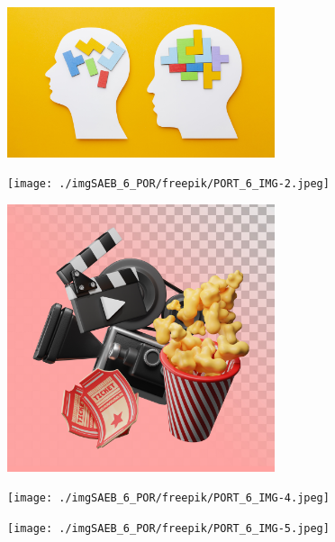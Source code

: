 \begin{figure}
\includegraphics[width=0.7\textwidth]{./imgSAEB_6_POR/freepik/PORT_6_IMG-1.jpeg}
\end{figure}

\begin{figure}
\texttt{[image: ./imgSAEB\_6\_POR/freepik/PORT\_6\_IMG-2.jpeg]}
\end{figure}

\begin{figure}
\includegraphics[width=0.7\textwidth]{./imgSAEB_6_POR/freepik/PORT_6_IMG-3.jpeg}
\end{figure}

\begin{figure}
\texttt{[image: ./imgSAEB\_6\_POR/freepik/PORT\_6\_IMG-4.jpeg]}
\end{figure}

\begin{figure}
\texttt{[image: ./imgSAEB\_6\_POR/freepik/PORT\_6\_IMG-5.jpeg]}
\end{figure}

